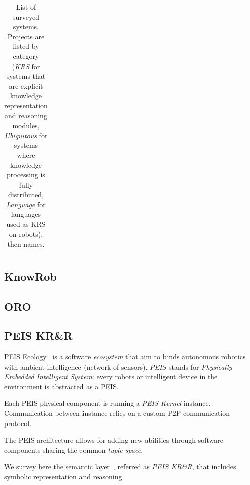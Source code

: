 \documentclass[a4paper, twocolumn]{article}
\begin{document}
\begin{landscape}
\begin{table}
\begin{center}
\begin{tabular}{p{2.2cm}p{1.6cm}p{4cm}lp{2.4cm}p{3.4cm}p{2.8cm}p{1.5cm}}
\hline

\end{tabular}
\end{center}
\caption{List of surveyed systems. Projects are listed by category (\emph{KRS} for systems that are explicit knowledge representation and reasoning modules, \emph{Ubiquitous} for systems where knowledge processing is fully distributed, \emph{Language} for languages used as KRS on robots), then names.}
\label{table|surveyed-systems}
\end{table}
\end{landscape}


\subsection{KnowRob}
\label{sect|knowrob}

\subsection{ORO}
\label{sect|oro}

\subsection{PEIS KR\&R}
\label{sect|peis-ecology}


{\sc PEIS Ecology}~\cite{Saffiotti2005} is a software \emph{ecosystem} that aim to binds autonomous
robotics with ambient intelligence (network of sensors). \emph{PEIS} stands for
\emph{Physically Embedded Intelligent System}: every robots or intelligent
device in the environment is abstracted as a PEIS.

Each PEIS physical component is running a \emph{PEIS Kernel} instance. Communication
between instance relies on a custom P2P communication protocol.

The PEIS architecture allows for adding new abilities through software components sharing the common \emph{tuple space}.

We survey here the semantic layer~\cite{Daoutis2009}, referred as \emph{PEIS KR\&R}, that includes symbolic representation and reasoning.
\end{document}
